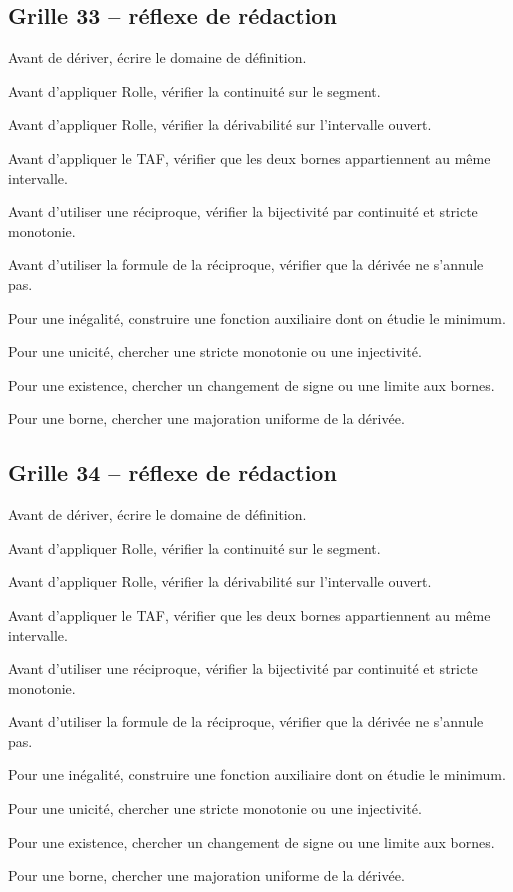 \documentclass[11pt,a4paper]{article}
\begin{document}
\subsection*{Grille 33 -- réflexe de rédaction}

\begin{methodebox}

Avant de dériver, écrire le domaine de définition.

Avant d'appliquer Rolle, vérifier la continuité sur le segment.

Avant d'appliquer Rolle, vérifier la dérivabilité sur l'intervalle ouvert.

Avant d'appliquer le TAF, vérifier que les deux bornes appartiennent au même intervalle.

Avant d'utiliser une réciproque, vérifier la bijectivité par continuité et stricte monotonie.

Avant d'utiliser la formule de la réciproque, vérifier que la dérivée ne s'annule pas.

Pour une inégalité, construire une fonction auxiliaire dont on étudie le minimum.

Pour une unicité, chercher une stricte monotonie ou une injectivité.

Pour une existence, chercher un changement de signe ou une limite aux bornes.

Pour une borne, chercher une majoration uniforme de la dérivée.

\end{methodebox}

\subsection*{Grille 34 -- réflexe de rédaction}

\begin{methodebox}

Avant de dériver, écrire le domaine de définition.

Avant d'appliquer Rolle, vérifier la continuité sur le segment.

Avant d'appliquer Rolle, vérifier la dérivabilité sur l'intervalle ouvert.

Avant d'appliquer le TAF, vérifier que les deux bornes appartiennent au même intervalle.

Avant d'utiliser une réciproque, vérifier la bijectivité par continuité et stricte monotonie.

Avant d'utiliser la formule de la réciproque, vérifier que la dérivée ne s'annule pas.

Pour une inégalité, construire une fonction auxiliaire dont on étudie le minimum.

Pour une unicité, chercher une stricte monotonie ou une injectivité.

Pour une existence, chercher un changement de signe ou une limite aux bornes.

Pour une borne, chercher une majoration uniforme de la dérivée.

\end{methodebox}
\end{document}
